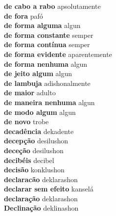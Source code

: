 \textbf{ de cabo a rabo  } apsolutamente \\
\textbf{ de fora  } pafó \\
\textbf{ de forma alguma  } algun \\
\textbf{ de forma constante  } semper \\
\textbf{ de forma contínua  } semper \\
\textbf{ de forma evidente  } aparentemente \\
\textbf{ de forma nenhuma  } algun \\
\textbf{ de jeito algum  } algun \\
\textbf{ de lambuja  } adishonalmente \\
\textbf{ de maior  } adulto \\
\textbf{ de maneira nenhuma  } algun \\
\textbf{ de modo algum  } algun \\
\textbf{ de novo  } trobe \\
\textbf{ decadência  } dekadente \\
\textbf{ decepção  } desilushon \\
\textbf{ deceção  } desilushon \\
\textbf{ decibéis  } decibel \\
\textbf{ decisão  } konklushon \\
\textbf{ declaracão  } deklarashon \\
\textbf{ declarar sem efeito  } kanselá \\
\textbf{ declaração  } deklarashon \\
\textbf{ Declinação  } deklinashon \\
